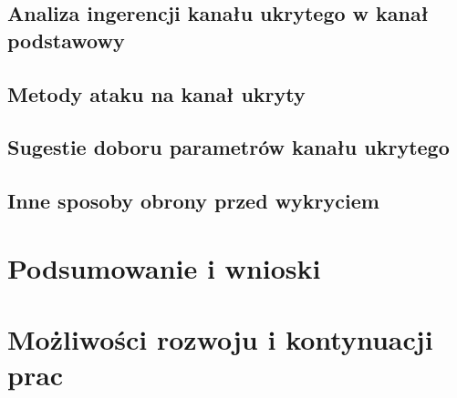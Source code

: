 \documentclass[a4paper, twoside, 12pt]{report}
\begin{document}
    \section{Analiza ingerencji kanału ukrytego w kanał podstawowy}
    \section{Metody ataku na kanał ukryty}
    \section{Sugestie doboru parametrów kanału ukrytego} \label{SUGESTIEPARAMETROW}
    \section{Inne sposoby obrony przed wykryciem}

\chapter{Podsumowanie i wnioski}
\chapter{Możliwości rozwoju i kontynuacji prac}

\clearpage
{}


\end{document}
